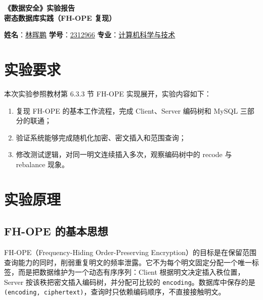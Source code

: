 \documentclass[a4paper]{article}
\begin{document}
\renewcommand{\contentsname}{目\ 录}
\renewcommand{\appendixname}{附录}
\renewcommand{\appendixpagename}{附录}
\renewcommand{\refname}{参考文献} 
\renewcommand{\figurename}{图}
\renewcommand{\tablename}{表}
\renewcommand{\today}{\number\year 年 \number\month 月 \number\day 日}


\renewcommand {\thefigure}{\thesection{}.\arabic{figure}}

\newpage
\begin{center}
    \huge{\textbf{《数据安全》实验报告}}\\
    \vspace {0.5em}
    \Large {\textbf {密态数据库实践（FH-OPE 复现）}}
\end{center}

\begin{center}
    \textbf{姓名}：\underline{林晖鹏} \quad
    \textbf{学号}：\underline{2312966} \quad
    \textbf{专业}：\underline{计算机科学与技术}
\end{center}

\vspace{1em} 

\tableofcontents

\newpage

\section{实验要求}
本次实验参照教材第 6.3.3 节 FH-OPE 实现展开，实验内容如下：
\begin{enumerate}
    \item 复现 FH-OPE 的基本工作流程，完成 Client、Server 编码树和 MySQL 三部分的联通；
    \item 验证系统能够完成随机化加密、密文插入和范围查询；
    \item 修改测试逻辑，对同一明文连续插入多次，观察编码树中的 recode 与 rebalance 现象。
\end{enumerate}

\section{实验原理}
\subsection{FH-OPE 的基本思想}
FH-OPE（Frequency-Hiding Order-Preserving Encryption）的目标是在保留范围查询能力的同时，削弱重复明文的频率泄露。它不为每个明文固定分配一个唯一标签，而是把数据维护为一个动态有序序列：Client 根据明文决定插入秩位置，Server 按该秩把密文插入编码树，并分配可比较的 \texttt{encoding}。数据库中保存的是 \texttt{(encoding, ciphertext)}，查询时只依赖编码顺序，不直接接触明文。
\end{document}
